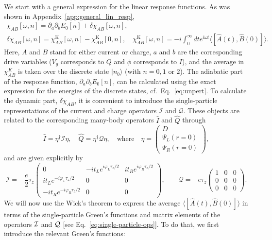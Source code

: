 \documentclass[aps,reprint,longbibliography, prb]{revtex4-2}
\begin{document}
We start with a general expression for the linear response functions. As was shown in Appendix~\ref{app:general_lin_resp}, 
\begin{gather}
    \chi_{AB}[\omega, n] = \partial_a \partial_b E_0[n] + \delta\chi_{AB}[\omega,n],\\
   \delta\chi_{AB}[\omega,n] = \chi^\mathrm{K}_{AB}[\omega,n] - \chi^\mathrm{K}_{AB}[0,n],\quad \chi^\mathrm{K}_{AB}[\omega,n] = -i\int_{0}^{\infty}dt e^{i\omega t}\langle[\hat{A}(t),\hat{B}(0)]\rangle.
\end{gather}
Here, $A$ and $B$ stand for either current or charge, $a$ and $b$ are the corresponding drive variables ($V_g$ corresponds to $Q$ and $\phi$ corresponds to $I$), and the average in $\chi_{AB}^K$ is taken over the discrete state $|n_0\rangle$ (with $n=0,1$ or $2$).
The adiabatic part of the response function, $\partial_a\partial_b E_0[n]$, can be calculated using the exact expression for the energies of the discrete states, cf.~Eq.~\eqref{eq:unpert}. To calculate the dynamic part, $\delta\chi_{AB}$, it is convenient to introduce the single-particle representations of the current and charge operators $\mathcal{I}$ and $\mathcal{Q}$. These objects are related to the corresponding many-body operators $\hat{I}$ and $\hat{Q}$ through
\begin{equation}
\hat{I} =\eta^{\dagger} \mathcal{I} \eta,\quad \hat{Q} =\eta^{\dagger} \mathcal{Q} \eta,\quad\text{where}\quad\eta = \begin{pmatrix}
D\\
\Psi_L(r=0)\\
\Psi_R(r=0)
\end{pmatrix},
\end{equation}
and are given explicitly by
\begin{equation}
\label{eq:single-particle-ops}
\mathcal{I} = -\frac{e}{2}\tau_{z}\begin{pmatrix}
0 & -it_{L}e^{i\varphi_{L}\tau_{z}/2} & it_{R}e^{i\varphi_{R}\tau_{z}/2}\\
it_{L}e^{-i\varphi_{L}\tau_{z}/2} & 0 & 0\\
-it_{R}e^{-i\varphi_{R}\tau_{z}/2} & 0 & 0
\end{pmatrix}, \quad\quad
\mathcal{Q} = - e \tau_z
\begin{pmatrix}
1 & 0 & 0\\
0 & 0 & 0\\
0 & 0 & 0
\end{pmatrix}.
\end{equation}
We will now use the Wick's theorem to express the average $\langle [\hat{A}(t), \hat{B}(0)] \rangle$ in terms of the single-particle Green's functions and matrix elements of the operators ${\cal I}$ and ${\cal Q}$ [see Eq.~\eqref{eq:single-particle-ops}]. To do that, we first introduce the relevant Green's functions:
\end{document}
